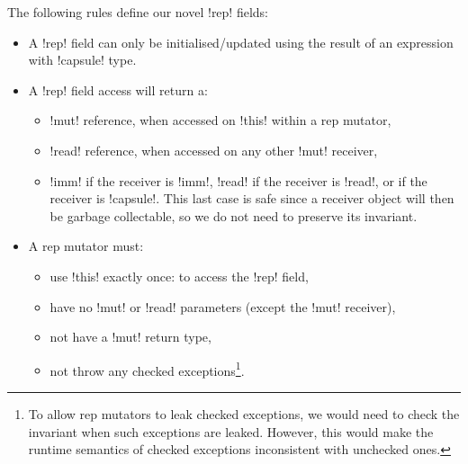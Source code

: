 The following rules define our novel \Q!rep! fields:
\begin{itemize}
\item A \Q!rep! field can only be initialised/updated using the result of an expression with  \Q!capsule! type.
\item A \Q!rep! field access will return a:
\begin{itemize}
\item \Q!mut! reference, when accessed on \Q!this! within a rep mutator,
\item \Q!read! reference, when accessed on any other \Q!mut! receiver,
\item \Q!imm! if the receiver is \Q!imm!, \Q!read! if the receiver is \Q!read!, or \Q@capsule@ if the receiver is
\Q!capsule!. This last case is safe since a \Q@capsule@ receiver object will then be garbage collectable, so we do not need to preserve its invariant.
\end{itemize}
\item A rep mutator must:
\begin{itemize}
\item use \Q!this! exactly once: to access the \Q!rep! field,
\item have no \Q!mut! or \Q!read! parameters (except the \Q!mut! receiver),
\item not have a \Q!mut! return type,
\item not throw any checked exceptions\footnote{To allow rep mutators to leak checked exceptions, we would need to check the invariant when such exceptions are leaked. However, this would make the runtime semantics of checked exceptions inconsistent with unchecked ones.}.
\end{itemize}
\end{itemize}	

